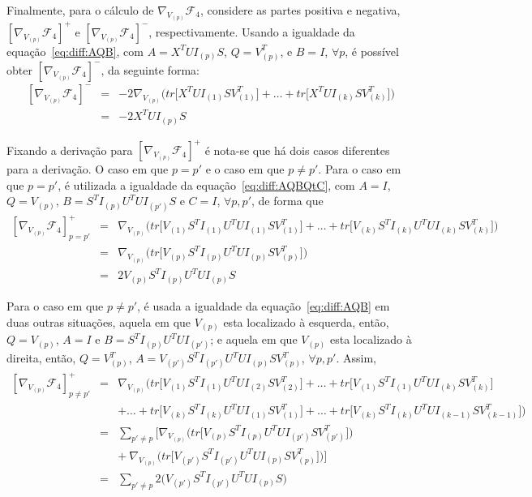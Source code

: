 \documentclass[
    12pt,                %
    oneside,            %
    a4paper,            %
    english,            %
    brazil                %
    ]{abntex2ppgsi}
\begin{document}
Finalmente, para o cálculo de $\nabla_{V_{(p)}} \mathcal{F}_4$, considere as partes positiva e negativa, $[\nabla_{V_{(p)}} \mathcal{F}_4]^+$ e $[\nabla_{V_{(p)}} \mathcal{F}_4]^-$, respectivamente. Usando a igualdade da equação~\ref{eq:diff:AQB}, com $A = X^T U I_{(p)} S$, $Q = V^{T}_{(p)}$, e $B = I$, $\forall p$, é possível obter $[\nabla_{V_{(p)}} \mathcal{F}_4]^-$, da seguinte forma:
\[
\begin{array}{lcl}
[\nabla_{V_{(p)}} \mathcal{F}_4]^- & = & - 2 \nabla_{V_{(p)}} \Big( tr\big[ X^T U I_{(1)}SV_{(1)}^T \big] + \dots + tr\big[ X^T U I_{(k)}SV_{(k)}^T \big] \Big) \\
& = & - 2 X^T U I_{(p)} S
\end{array}
\]

Fixando a derivação para $[\nabla_{V_{(p)}} \mathcal{F}_4]^+$ é nota-se que há dois casos diferentes para a derivação. O caso em que $p = p'$ e o caso em que $p \neq p'$. Para o caso em que $p = p'$, é utilizada a igualdade da equação~\ref{eq:diff:AQBQtC}, com $A = I$, $Q = V_{(p)}$, $B = S^T I_{(p)} U^T U I_{(p')} S$ e $C = I$, $\forall p, p'$, de forma que
\[
\begin{array}{lcl}
[\nabla_{V_{(p)}} \mathcal{F}_4]^{+}_{p=p'} & = & \nabla_{V_{(p)}} \Big( tr\big[ V_{(1)} S^T I_{(1)} U^T U I_{(1)} S V_{(1)}^T \big] + \dots + tr\big[ V_{(k)} S^T I_{(k)} U^T U I_{(k)} S V_{(k)}^T \big] \Big) \\
& = & \nabla_{V_{(p)}} \Big( tr\big[ V_{(p)} S^T I_{(p)} U^T U I_{(p)} S V_{(p)}^T \big] \Big)  \\
& = & 2 V_{(p)} S^T I_{(p)} U^T U I_{(p)} S
\end{array}
\]

Para o caso em que $p \neq p'$, é usada a igualdade da equação~\ref{eq:diff:AQB} em duas outras situações, aquela em que $V_{(p)}$ esta localizado à esquerda, então, $Q = V_{(p)}$, $A = I$ e $B = S^T I_{(p)} U^T U I_{(p')}$; e aquela em que $V_{(p)}$ esta localizado à direita, então, $Q = V_{(p)}^T$, $A = V_{(p')} S^T I_{(p')} U^T U I_{(p)} S V_{(p)}^T$, $\forall p, p'$. Assim,
\[
\begin{array}{lcl}
[\nabla_{V_{(p)}} \mathcal{F}_4]^{+}_{p \neq p'} & = & \nabla_{V_{(p)}} \Big( tr\big[ V_{(1)} S^T I_{(1)} U^T U I_{(2)} S V_{(2)}^T \big] + \dots + tr\big[ V_{(1)} S^T I_{(1)} U^T U I_{(k)} S V_{(k)}^T \big] \\
                                   &   & + \dots + tr\big[ V_{(k)} S^T I_{(k)} U^T U I_{(1)} S V_{(1)}^T \big] + \dots + tr\big[ V_{(k)} S^T I_{(k)} U^T U I_{(k-1)} S V_{(k-1)}^T \big] \Big) \\
                                   & = & \sum_{p' \neq p} \bigg[ \nabla_{V_{(p)}} \Big( tr\big[ V_{(p)} S^T I_{(p)} U^T U I_{(p')} S V_{(p')}^T \big] \Big) \\
                                   &   & + ~ \nabla_{V_{(p)}} \Big( tr\big[ V_{(p')} S^T I_{(p')} U^T U I_{(p)} S V_{(p)}^T \big] \Big) \bigg] \\
                                   & = & \sum_{p' \neq p} 2 \big( V_{(p')} S^T I_{(p')} U^T U I_{(p)} S \big)
    \end{array}
\]
\end{document}
